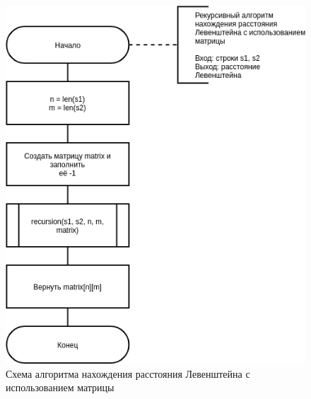 \begin{figure}[H]
	\begin{center}
		\includegraphics[scale=0.6]{img/cache.png}
	\end{center}
	\captionsetup{justification=centering}
	\caption{Схема алгоритма нахождения расстояния Левенштейна с использованием матрицы}
	\label{img:cache}
\end{figure}

